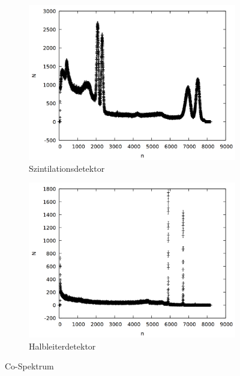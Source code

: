 \begin{figure}[h]
  \centering
  \begin{subfigure}[h]{0.5\textwidth}
    \centering
    \includegraphics[width=\textwidth]{data/si_co_raw.png}
    \caption{Szintilationsdetektor}
  \end{subfigure}%
  \begin{subfigure}[h]{0.5\textwidth}
    \centering
    \includegraphics[width=\textwidth]{data/ge_co_raw.png}
    \caption{Halbleiterdetektor}
  \end{subfigure}
  \caption{Co-Spektrum}
\end{figure}

